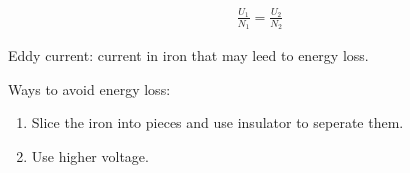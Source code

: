             \begin{align}
                \frac{U_1}{N_1} = \frac{U_2}{N_2}
            \end{align}
            
            Eddy current: current in iron that may leed to energy loss.

            Ways to avoid energy loss:
            \begin{enumerate}
                \item Slice the iron into pieces and use insulator to seperate them.
                \item Use higher voltage.
            \end{enumerate}